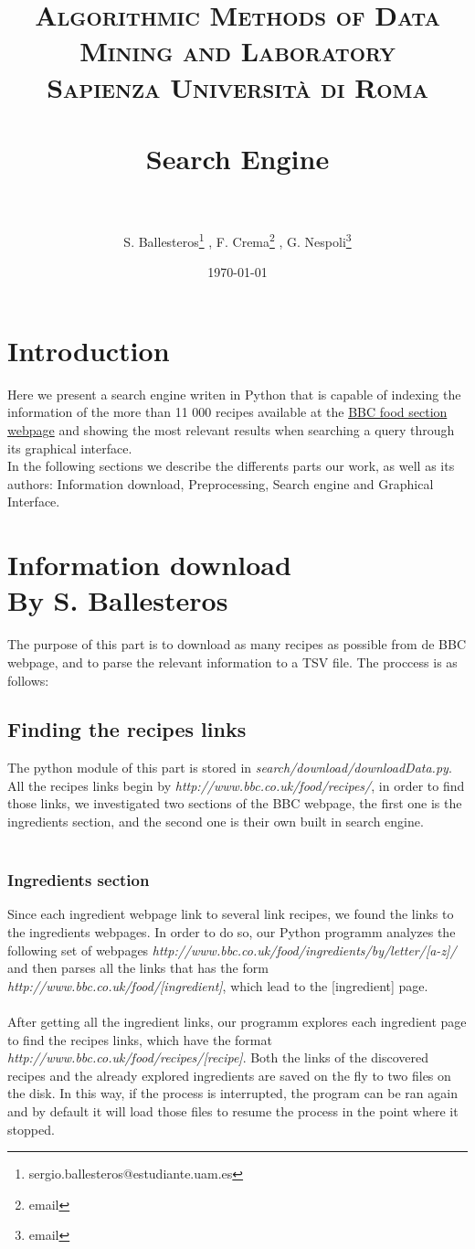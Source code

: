 \documentclass[paper=a4, fontsize=11pt]{scrartcl} %
\title{	
\normalfont \normalsize 
\textsc{Algorithmic Methods of Data Mining and Laboratory} \\ [25pt] %
\textsc{Sapienza Università di Roma} \\ [25pt]
\horrule{0.5pt} \\[0.4cm] %
\huge Search Engine\\ %
\horrule{2pt} \\[0.5cm] %
}
\author{S. Ballesteros\footnote{sergio.ballesteros@estudiante.uam.es} , F. Crema\footnote{email} , G. Nespoli\footnote{email}} %
\date{\normalsize\today} %
\numberwithin{equation}{section} %
\numberwithin{figure}{section} %
\numberwithin{table}{section} %
\begin{document}
\maketitle %


\section{Introduction}
Here we present a search engine writen in Python that is capable of indexing the information of the more than 11 000 recipes available at the \href{http://www.bbc.co.uk/food/recipes/}{BBC  food section webpage} and showing the most relevant results when searching a query through its graphical interface. \\
In the following sections we describe the differents parts our work, as well as its authors: Information download, Preprocessing, Search engine and Graphical Interface.

\section{Information download \\ {\large By S. Ballesteros}}
The purpose of this part is to download as many recipes as possible from de BBC webpage, and to parse the relevant information to a TSV file. The proccess is as follows:
\subsection{Finding the recipes links}
The python module of this part is stored in \textit{search/download/downloadData.py}. All the recipes links begin by \textit{http://www.bbc.co.uk/food/recipes/}, in order to find those links, we investigated two sections of the BBC webpage, the first one is the ingredients section, and the second one is their own built in search engine. \\\
\subsubsection{Ingredients section}
Since each ingredient webpage link to several link recipes, we found the links to the ingredients webpages. In order to do so, our Python programm analyzes the following set of webpages \textit{http://www.bbc.co.uk/food/ingredients/by/letter/[a-z]/} and then parses all the links that has the form \textit{http://www.bbc.co.uk/food/[ingredient]}, which lead to the [ingredient] page. \\ \\
After getting all the ingredient links, our programm explores each ingredient page to find the recipes links, which have the format \textit{http://www.bbc.co.uk/food/recipes/[recipe]}. Both the links of the discovered recipes and the already explored ingredients are saved on the fly to two files on the disk. In this way, if the process is interrupted, the program can be ran again and by default it will load those files to resume the process in the point where it stopped.
\end{document}
